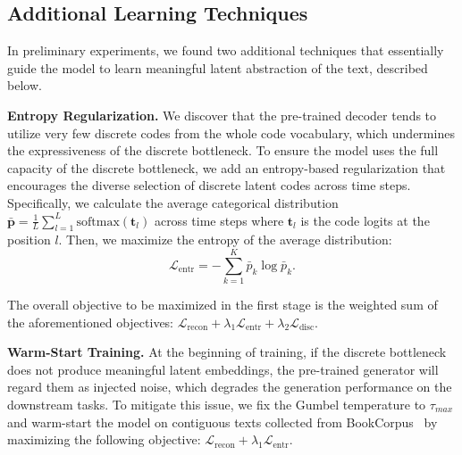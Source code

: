 \documentclass[11pt]{article}
\begin{document}


\subsection{Additional Learning Techniques}

In preliminary experiments, we found two additional techniques that essentially guide the model to learn meaningful latent abstraction of the text, described below.

\noindent\textbf{Entropy Regularization.} %
We discover that the pre-trained decoder tends to utilize very few discrete codes from the whole code vocabulary, which undermines the expressiveness of the discrete bottleneck. To ensure the model uses the full capacity of the discrete bottleneck, we add an entropy-based regularization that encourages the diverse selection of discrete latent codes across time steps. Specifically, we calculate the average categorical distribution $\bar{\boldsymbol{p}}=\frac{1}{L}\sum_{l=1}^L\text{softmax}(\boldsymbol{t}_l)$ across time steps where $\boldsymbol{t}_l$ is the code logits at the position $l$. Then, we maximize the entropy of the average distribution:
\begin{equation}
    \mathcal{L}_{\text{entr}} = - \sum_{k=1}^K \bar{p}_k\log \bar{p}_k.
\end{equation}

The overall objective to be maximized in the first stage is the weighted sum of the aforementioned objectives: $\mathcal{L}_{\text{recon}} + \lambda_1 \mathcal{L}_{\text{entr}} + \lambda_2 \mathcal{L}_{\text{disc}}$.

\noindent\textbf{Warm-Start Training.} At the beginning of training, if the discrete bottleneck does not produce meaningful latent embeddings, the pre-trained generator will regard them as injected noise, which degrades the generation performance on the downstream tasks. To mitigate this issue, we fix the Gumbel temperature to $\tau_{max}$ and warm-start the model on contiguous texts collected from BookCorpus~\citep{bookcorpus} by maximizing the following objective: $\mathcal{L}_{\text{recon}} + \lambda_1 \mathcal{L}_{\text{entr}}$.
\end{document}
